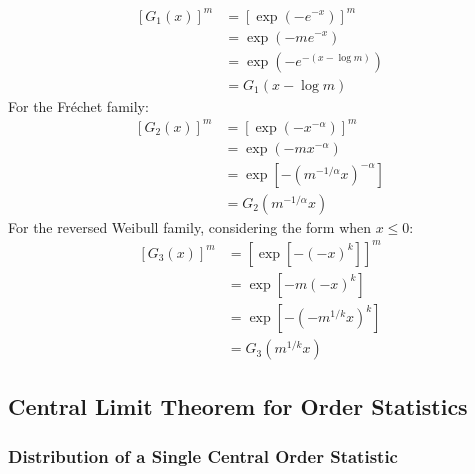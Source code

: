 \documentclass[11pt]{report} %
\begin{document}
\begin{align}
\left[G_{1}\left(x\right)\right]^{m} &= \left[\exp\left(-e^{-x}\right)\right]^{m} \\
&= \exp\left(-me^{-x}\right) \\
&= \exp\left(-e^{-\left(x - \log m\right)}\right) \\
&= G_{1}\left(x - \log m\right)
\end{align}
For the Fr\'{e}chet family:
\begin{align}
\left[G_{2}\left(x\right)\right]^{m} &= \left[\exp\left(-x^{-\alpha}\right)\right]^{m} \\
&= \exp\left(-mx^{-\alpha}\right) \\
&= \exp\left[-\left(m^{-1/\alpha}x\right)^{-\alpha}\right] \\
&= G_{2}\left(m^{-1/\alpha}x\right)
\end{align}
For the reversed Weibull family, considering the form when $x \leq 0$:
\begin{align}
\left[G_{3}\left(x\right)\right]^{m} &= \left[\exp\left[-\left(-x\right)^{k}\right]\right]^{m} \\
&= \exp\left[-m\left(-x\right)^{k}\right] \\
&= \exp\left[-\left(-m^{1/k}x\right)^{k}\right] \\
&= G_{3}\left(m^{1/k}x\right)
\end{align}

\subsection{Central Limit Theorem for Order Statistics}

\subsubsection{Distribution of a Single Central Order Statistic}
\end{document}
